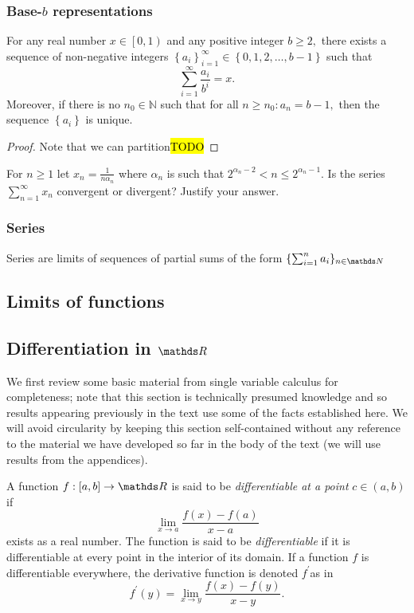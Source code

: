 \subsubsection{\label{subsec:baseBRepresentations}Base-$b$ representations}
\begin{thm}
\label{thm:realDecimalExpansion}For any real number $x\in\left[0,1\right)$
and any positive integer $b\geq2,$ there exists a sequence of non-negative
integers $\left\{ a_{i}\right\} _{i=1}^{\infty}\in\left\{ 0,1,2,\ldots,b-1\right\} $
such that 
\[
\sum_{i=1}^{\infty}\frac{a_{i}}{b^{i}}=x.
\]
Moreover, if there is no $n_{0}\in\mathbb{N}$ such that for all $n\geq n_{0}:a_{n}=b-1,$
then the sequence $\left\{ a_{i}\right\} $ is unique.
\end{thm}

\begin{proof}
Note that we can partition\hl{TODO}
\end{proof}
\begin{example}
\label{exa:isi2004samplepsb11}For $n\geq1$ let $x_{n}=\frac{1}{n\alpha_{n}}$
where $\alpha_{n}$ is such that $2^{\alpha_{n}-2}<n\leq2^{\alpha_{n}-1}$.
Is the series $\sum_{n=1}^{\infty}x_{n}$ convergent or divergent?
Justify your answer.
\end{example}

\subsubsection{Series}

Series are limits of sequences of partial sums of the form $\{\sum_{i=1}^n a_i \}_{n\in\N}$


\subsection{Limits of functions}

\subsection{Differentiation in $\R$\label{subsec:reviewDifferentiation}}

We first review some basic material from single variable calculus
for completeness; note that this section is technically presumed knowledge
and so results appearing previously in the text use some of the facts
established here. We will avoid circularity by keeping this section
self-contained without any reference to the material we have developed
so far in the body of the text (we will use results from the appendices).
\begin{defn}
	\label{def:differentiable}A function $f:\left[a,b\right]\to\R$ is
	said to be \emph{differentiable at a point }$c\in\left(a,b\right)$
	if 
	\[
	\lim_{x\to a}\frac{f\left(x\right)-f\left(a\right)}{x-a}
	\]
	exists as a real number. The function is said to be \emph{differentiable
	}if it is differentiable at every point in the interior of its domain.
	If a function $f$ is differentiable everywhere, the derivative function
	is denoted $f^{\prime}$as in 
	\[
	f^{\prime}\left(y\right)=\lim_{x\to y}\frac{f\left(x\right)-f\left(y\right)}{x-y}.
	\]
\end{defn}


